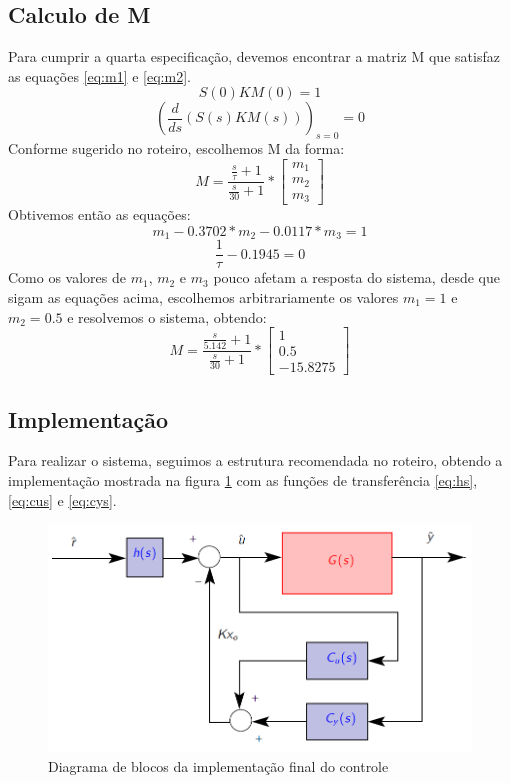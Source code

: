 \documentclass{article}
\begin{document}
\subsection{Calculo de M}
Para cumprir a quarta especificação, devemos encontrar a matriz M que satisfaz as equações \ref{eq:m1} e \ref{eq:m2}.
\begin{equation}
\label{eq:m1}
S(0)KM(0) = 1
\end{equation}
\begin{equation}
\label{eq:m2}
(\frac{d}{ds}(S(s)KM(s)))_{s=0}= 0
\end{equation}
Conforme sugerido no roteiro\cite{bb:roteiro}, escolhemos M da forma:
\begin{equation}
\label{eq:mlayout}
M = \frac{\frac{s}{\tau} + 1}{\frac{s}{30} + 1}*\begin{bmatrix}
m_1\\
m_2\\
m_3
\end{bmatrix}
\end{equation}
Obtivemos então as equações:
\begin{equation}
	m_1 - 0.3702*m_2 - 0.0117*m_3 = 1
\end{equation}
\begin{equation}
	\frac{1}{\tau} - 0.1945 = 0
\end{equation}
Como os valores de $m_1$, $m_2$ e $m_3$ pouco afetam a resposta do sistema, desde que sigam as equações acima, escolhemos arbitrariamente os valores $m_1 = 1$ e $m_2 = 0.5$ e resolvemos o sistema, obtendo:
\begin{equation}
\label{eq:mvalor}
M = \frac{\frac{s}{5.142} + 1}{\frac{s}{30} + 1}*
\begin{bmatrix}
	1\\
	0.5\\
	-15.8275
\end{bmatrix}
\end{equation}

\subsection{Implementação}
Para realizar o sistema, seguimos a estrutura recomendada no roteiro\cite{bb:roteiro}, obtendo a implementação mostrada na figura \ref{fig:impl} com as funções de transferência \ref{eq:hs}, \ref{eq:cus} e \ref{eq:cys}.
\begin{figure}[H]
	\centering
	\includegraphics[width=0.8\linewidth]{impl}
	\caption{Diagrama de blocos da implementação final do controle}
	\label{fig:impl}
\end{figure}
\end{document}
